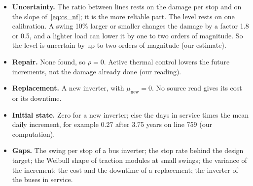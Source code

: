 \documentclass[11pt,a4paper]{article}
\theoremstyle{plain}
\theoremstyle{definition}
\theoremstyle{remark}
\begin{document}
\begin{itemize}
\begin{itemize}
        Half of the stops are uphill and half downhill on the mean uphill grade $\theta^{\uparrow}_j$ (the ascent of both directions over half the round trip), with $g = 9.81$\,m/s$^2$ and an acceleration $a = 1.0$\,m/s$^2$ at stops (assumption).
        So $G_j = 1.16$ on line 759 and $1.38$ on line 768.
      \item $F_k = \exp\bigl(E_a/k_B \cdot (1/T_{jm,\mathrm{ref}} - 1/T_{jm,k})\bigr)$ corrects for the coolant temperature of period~$k$: a factor 1.15 or 0.86 for 10\,K more or less (our computation).
        No source read links the coolant temperature to the ambient temperature.
    \end{itemize}
    So the damage is $8.3 \cdot 10^{-7}$ per km on line 759 and $1.16 \cdot 10^{-6}$ on line 768, that is $2.0 \cdot 10^{-4}$ and $2.65 \cdot 10^{-4}$ per weekday (our computation).
    A car study gives $4.6 \cdot 10^{-7}$ to $1.5 \cdot 10^{-6}$ per km on two test cycles (our computation from~\cite[Table~VII]{Lu2023}), the same order.
  \item \textbf{Uncertainty.}
    The ratio between lines rests on the damage per stop and on the slope of~\eqref{eq:cs_nf}; it is the more reliable part.
    The level rests on one calibration.
    A swing 10\% larger or smaller changes the damage by a factor 1.8 or 0.5, and a lighter load can lower it by one to two orders of magnitude.
    So the level is uncertain by up to two orders of magnitude (our estimate).
  \item \textbf{Repair.}
    None found, so $\rho = 0$.
    Active thermal control lowers the future increments, not the damage already done (our reading).
  \item \textbf{Replacement.}
    A new inverter, with $\mu_{\mathrm{new}} = 0$.
    No source read gives its cost or its downtime.
  \item \textbf{Initial state.}
    Zero for a new inverter; else the days in service times the mean daily increment, for example 0.27 after 3.75 years on line 759 (our computation).
  \item \textbf{Gaps.}
    The swing per stop of a bus inverter; the stop rate behind the design target; the Weibull shape of traction modules at small swings; the variance of the increment; the cost and the downtime of a replacement; the inverter of the buses in service.
\end{itemize}
\end{document}
